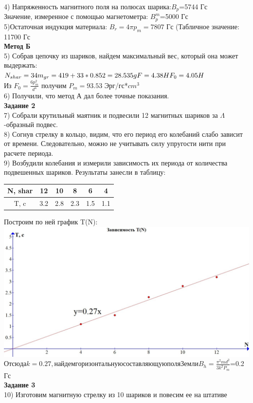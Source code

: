 \documentclass[a4paper,12pt]{article} %
\begin{document}
4) Напряженность магнитного поля на полюсах шарика:$B_p$=5744 Гс\\
Значение, измеренное с помощью магнетометра: $B^m_p$=5000 Гс\\
5)Остаточная индукция материала: $B_r=4\pi p_m=7807$ Гс (Табличное значение: 11700 Гс \\
\textbf{Метод Б} \\
5) Собрав цепочку из шариков, найдем максимальный вес, который она может выдержать:\\
$
N_{shar}=34\\
m_{gr}=419+33*0.852=28.535 g	\\
F=4.38 H\\
F_0=4.05 H$\\
Из $F_0=\frac{6p^2_m}{d^4}$ получим $P_m=93.53$ Эрг/гс*$cm^3$\\
6) Получили, что метод А дал более точные показания.
\\
\textbf{Задание 2} \\
7) Собрали крутильный маятник и подвесили 12 магнитных шариков за $\Lambda$-образный подвес.\\
8) Согнув стрелку в кольцо, видим, что его период его колебаний слабо зависит от времени. Следовательно, можно не учитывать силу упругости нити при расчете периода.\\
9) Возбудили колебания и измерили зависимость их периода от количества подвешенных шариков. Результаты занесли в таблицу:\\
\begin{center}

\begin{tabular}{|c|c|c|c|c|c|}
\hline 
N, shar & 12 & 10 & 8 & 6 & 4 \\ 
\hline 
T, c & 3.2 & 2.8 & 2.3 & 1.5 & 1.1 \\ 
\hline 
\end{tabular} 
\end{center}

Построим по ней график T(N): \\
\includegraphics[scale=0.35]{1221}
\\
$Отсюда k=0.27, найдем горизонтальную составляющую поля Земли B_h=\frac{\pi^2 m d^2}{3k^2P_m}$=0.2 Гс
\\
\textbf{ Задание 3}\\
10) Изготовим магнитную стрелку из 10 шариков и повесим ее на штативе
\end{document}
